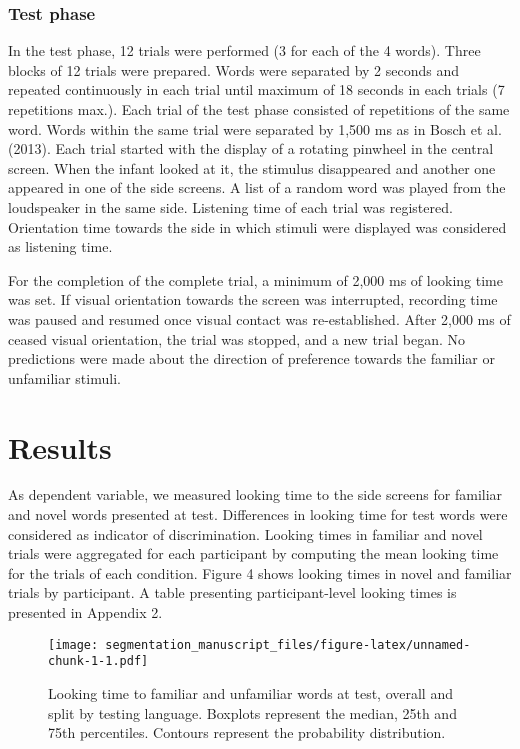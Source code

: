 \documentclass[man,floatsintext]{apa6}
\begin{document}
\hypertarget{test-phase}{%
\subsubsection{Test phase}\label{test-phase}}

In the test phase, 12 trials were performed (3 for each of the 4 words). Three blocks of 12 trials were prepared. Words were separated by 2 seconds and repeated continuously in each trial until maximum of 18 seconds in each trials (7 repetitions max.). Each trial of the test phase consisted of repetitions of the same word. Words within the same trial were separated by 1,500 ms as in Bosch et al. (2013). Each trial started with the display of a rotating pinwheel in the central screen. When the infant looked at it, the stimulus disappeared and another one appeared in one of the side screens. A list of a random word was played from the loudspeaker in the same side. Listening time of each trial was registered. Orientation time towards the side in which stimuli were displayed was considered as listening time.

For the completion of the complete trial, a minimum of 2,000 ms of looking time was set. If visual orientation towards the screen was interrupted, recording time was paused and resumed once visual contact was re-established. After 2,000 ms of ceased visual orientation, the trial was stopped, and a new trial began. No predictions were made about the direction of preference towards the familiar or unfamiliar stimuli.

\hypertarget{results}{%
\section{Results}\label{results}}

As dependent variable, we measured looking time to the side screens for familiar and novel words presented at test. Differences in looking time for test words were considered as indicator of discrimination. Looking times in familiar and novel trials were aggregated for each participant by computing the mean looking time for the trials of each condition. Figure 4 shows looking times in novel and familiar trials by participant. A table presenting participant-level looking times is presented in Appendix 2.

\begin{figure}
\centering
\texttt{[image: segmentation\_manuscript\_files/figure-latex/unnamed-chunk-1-1.pdf]}
\caption{\label{fig:unnamed-chunk-1}Looking time to familiar and unfamiliar words at test, overall and split by testing language. Boxplots represent the median, 25th and 75th percentiles. Contours represent the probability distribution.}
\end{figure}
\end{document}
